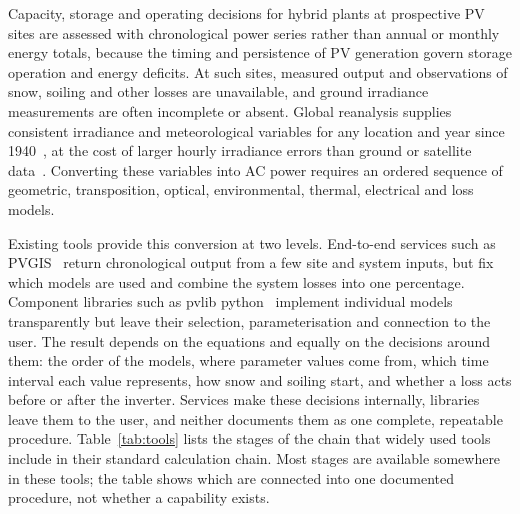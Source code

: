 \documentclass[11pt]{article}
\begin{document}
Capacity, storage and operating decisions for hybrid plants at prospective PV sites are assessed with chronological power series rather than annual or monthly energy totals, because the timing and persistence of PV generation govern storage operation and energy deficits. At such sites, measured output and observations of snow, soiling and other losses are unavailable, and ground irradiance measurements are often incomplete or absent. Global reanalysis supplies consistent irradiance and meteorological variables for any location and year since 1940~\cite{hersbachERA5Global2020}, at the cost of larger hourly irradiance errors than ground or satellite data~\cite{urraca2018era5}. Converting these variables into AC power requires an ordered sequence of geometric, transposition, optical, environmental, thermal, electrical and loss models.

Existing tools provide this conversion at two levels. End-to-end services such as PVGIS~\cite{huldNewSolarRadiation2012,suri2008pvgis} return chronological output from a few site and system inputs, but fix which models are used and combine the system losses into one percentage. Component libraries such as pvlib python~\cite{holmgrenPvlibPythonPython2018,anderson2023pvlib} implement individual models transparently but leave their selection, parameterisation and connection to the user. The result depends on the equations and equally on the decisions around them: the order of the models, where parameter values come from, which time interval each value represents, how snow and soiling start, and whether a loss acts before or after the inverter. Services make these decisions internally, libraries leave them to the user, and neither documents them as one complete, repeatable procedure. Table~\ref{tab:tools} lists the stages of the chain that widely used tools include in their standard calculation chain. Most stages are available somewhere in these tools; the table shows which are connected into one documented procedure, not whether a capability exists.
\end{document}
